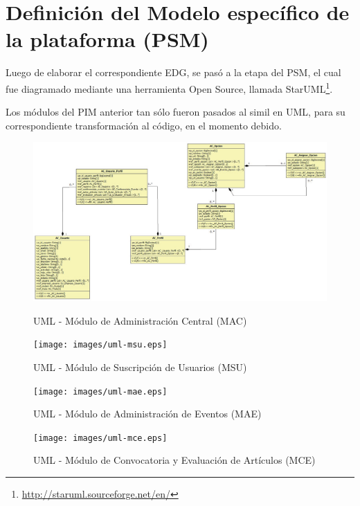 \section{Definici\'on del Modelo espec\'ifico de la plataforma (PSM)}
\begin{indentar}
Luego de elaborar el correspondiente EDG, se pas\'o a la etapa del PSM, el cual fue diagramado mediante una herramienta Open Source, llamada StarUML\footnote{\url{http://staruml.sourceforge.net/en/}}.

Los m\'odulos del PIM anterior tan s\'olo fueron pasados al simil en UML, para su correspondiente transformaci\'on al c\'odigo, en el momento debido.
\begin{landscape}
\begin{figure}
  \centering
    {\includegraphics[width=1.7\textwidth]{images/uml-mac.eps}}
  \caption{UML - M\'odulo de Administraci\'on Central (MAC)}
  \label{uml:mac}
\end{figure}
\end{landscape}

\begin{landscape}
\begin{figure}
  \centering
    {\texttt{[image: images/uml-msu.eps]}}
  \caption{UML - M\'odulo de Suscripci\'on de Usuarios (MSU)}
  \label{uml:msu}
\end{figure}
\end{landscape}

\begin{landscape}
\begin{figure}
  \centering
    {\texttt{[image: images/uml-mae.eps]}}
  \caption{UML - M\'odulo de Administraci\'on de Eventos (MAE)}
  \label{uml:mae}
\end{figure}
\end{landscape}

\begin{landscape}
\begin{figure}
  \centering
    {\texttt{[image: images/uml-mce.eps]}}
  \caption{UML - M\'odulo de Convocatoria y Evaluaci\'on de Art\'iculos (MCE)}
  \label{uml:mce}
\end{figure}
\end{landscape}

\end{indentar}

